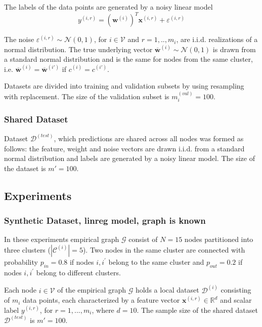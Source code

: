 \documentclass{article}
\begin{document}
The labels of the data points are generated by a noisy linear model
\begin{equation}
{y}^{(i,r)} = (\mathbf{w}^{(i)})^T\mathbf{x}^{(i,r)} + {\varepsilon}^{(i,r)}
\end{equation}

The noise ${\varepsilon}^{(i,r)} \sim \mathcal{N}(0, 1)$, for $i \in \mathcal{V}$ and $r=1,..,{m}_{i}$, are i.i.d. realizations of a normal distribution. The true underlying vector $\mathbf{\overline{w}}^{(i)} \sim \mathcal{N}(0,1)$ is drawn from a standard normal distribution and is the same for nodes from the same cluster, i.e. $\mathbf{\overline{w}}^{(i)}=\mathbf{\overline{w}}^{({i'})}$ if ${c}^{(i)}={c}^{({i'})}$.

Datasets are divided into training and validation subsets by using resampling with replacement. The size of the validation subset is ${m}^{(val)}_{i}=100$. 

\subsubsection{Shared Dataset}

Dataset $\mathcal{D}^{(test)}$, which predictions are shared across all nodes was formed as follows:
the feature, weight and noise vectors are drawn i.i.d. from a standard normal distribution and labels are generated by a noisy linear model. The size of the dataset is $m'=100$. 

\subsection{Experiments}

\subsubsection{Synthetic Dataset, linreg model, graph is known}

In these experiments empirical graph $\mathcal{G}$ consist of $N=15$ nodes partitioned into three clusters ($|\mathcal{C}^{(i)}|=5$). Two nodes in the same cluster are connected with probability ${p}_{in}=0.8$ if nodes $i,{i}^{'}$ belong to the same cluster and ${p}_{out}=0.2$ if nodes $i,{i}^{'}$ belong to different clusters. 

Each node $i \in \mathcal {V}$ of the empirical graph $\mathcal {G}$ holds a local dataset $\mathcal{D}^{(i)}$ consisting of ${m}_{i}$ data points, each characterized by a feature vector $\mathbf{x}^{(i,r)} \in \mathbb{R}^{d}$ and scalar label ${y}^{(i,r)}$, for $r=1,...,{m}_{i}$, where $d=10$.
The sample size of the shared dataset $\mathcal{D}^{(test)}$ is $m'=100$.
\end{document}

